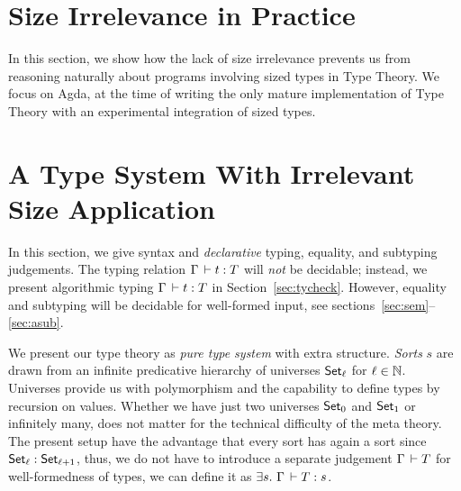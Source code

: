 \documentclass[acmlarge,review,anonymous]{acmart}\settopmatter{printfolios=true}
\begin{document}
\section{Size Irrelevance in Practice}
\label{sec:informal}

In this section, we show how the lack of size irrelevance prevents us from reasoning naturally about programs involving sized types in Type Theory.  We focus on Agda, at the time of writing the only mature implementation of Type Theory with an experimental integration of sized types.





\section{A Type System With Irrelevant Size Application}
\label{sec:syntax}

In this section, we give syntax and \emph{declarative} typing, equality, and subtyping judgements.  The typing relation $\Gamma \der t : T$ will \emph{not} be decidable; instead, we present algorithmic typing $\Gamma \der t \jchk T$ in Section~\ref{sec:tycheck}.  However, equality and subtyping will be decidable for well-formed input, see sections~\ref{sec:sem}--\ref{sec:asub}.

We present our type theory as \emph{pure type system} \cite{barendregt:lambdacube} with extra structure.
\emph{Sorts} $s$ are drawn from an infinite predicative hierarchy of universes $\Set[\ell]$ for $\ell \in \NN$.  Universes provide us with polymorphism and the capability to define types by recursion on values.  Whether we have just two universes $\Set[0]$ and $\Set[1]$ or infinitely many, does not matter for the technical difficulty of the meta theory.  The present setup have the advantage that every sort has again a sort since $\Set[\ell] : \Set[\ell+1]$, thus, we do not have to introduce a separate judgement $\Gamma \der T$ for well-formedness of types, we can define it as $\exists s.\ \Gamma \der T : s$.
\end{document}
